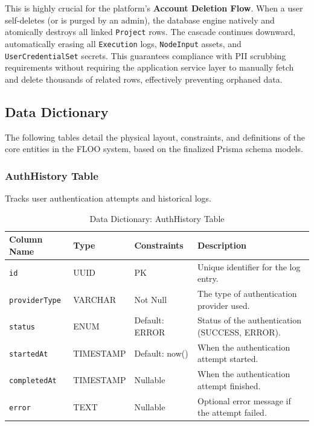 This is highly crucial for the platform's \textbf{Account Deletion Flow}. When a user self-deletes (or is purged by an admin), the database engine natively and atomically destroys all linked \texttt{Project} rows. The cascade continues downward, automatically erasing all \texttt{Execution} logs, \texttt{NodeInput} assets, and \texttt{UserCredentialSet} secrets. This guarantees compliance with PII scrubbing requirements without requiring the application service layer to manually fetch and delete thousands of related rows, effectively preventing orphaned data.

\subsection{Data Dictionary}
The following tables detail the physical layout, constraints, and definitions of the core entities in the FLOO system, based on the finalized Prisma schema models.

\subsubsection{AuthHistory Table}
Tracks user authentication attempts and historical logs.
\begin{table}[H]
\centering
\renewcommand{\arraystretch}{1.3}
\begin{tabularx}{\textwidth}{|l|l|l|X|}
\hline
\textbf{Column Name} & \textbf{Type} & \textbf{Constraints} & \textbf{Description} \\
\hline
\texttt{id} & UUID & PK & Unique identifier for the log entry. \\
\hline
\texttt{providerType} & VARCHAR & Not Null & The type of authentication provider used. \\
\hline
\texttt{status} & ENUM & Default: ERROR & Status of the authentication (SUCCESS, ERROR). \\
\hline
\texttt{startedAt} & TIMESTAMP & Default: now() & When the authentication attempt started. \\
\hline
\texttt{completedAt} & TIMESTAMP & Nullable & When the authentication attempt finished. \\
\hline
\texttt{error} & TEXT & Nullable & Optional error message if the attempt failed. \\
\hline
\end{tabularx}
\caption{Data Dictionary: AuthHistory Table}
\label{tab:dict-authhistory}
\end{table}

